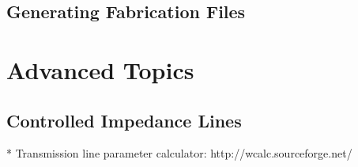 \documentclass[12pt,letterpaper]{scrartcl}
\begin{document}
\subsection{Generating Fabrication Files}

\section{Advanced Topics}

\subsection{Controlled Impedance Lines}

* Transmission line parameter calculator: http://wcalc.sourceforge.net/

\newpage



\end{document}
